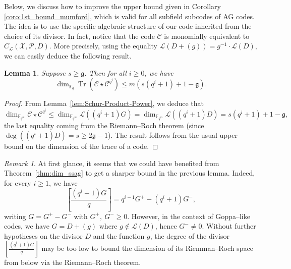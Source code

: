 \documentclass[a4paper]{amsart}
\newtheorem{lemma}[thm]{Lemma}
\theoremstyle{definition}
\theoremstyle{remark}
\newtheorem{remark}[thm]{Remark}
\newcommand{\calP}{\mathcal{P}}
\newcommand{\calL}{\mathcal{L}}
\newcommand{\calC}{\mathcal{C}}
\newcommand{\calX}{\mathcal{X}}
\newcommand{\fqm}{\mathbb{F}_{q^m}}
\newcommand{\fq}{\mathbb{F}_{q}}
\newcommand{\Tr}[1]{\operatorname{Tr}\left(#1\right)}
\begin{document}
Below, we discuss how to improve the upper bound given in Corollary \ref{coro:1st_bound_mumford}, which is valid for all subfield subcodes of AG codes. The idea is to use the specific algebraic structure of our code inherited from the choice of its divisor.
\noindent In fact, notice that the code $\calC$ is monomially equivalent to $C_{\calL}(\calX,\calP,D)$. 
More precisely, using the equality $\calL(D+(g)) = g^{-1} \cdot \calL(D),$
we can easily deduce the following result.

\begin{lemma} \label{lem:bound_dim_Tr(C*C^q^i)}
  Suppose $s \geq \mathfrak{g}$. Then for all $i \geq 0$, we have 
   $$\dim_{\fq} \Tr{\calC\star \calC^{q^i}} \leq m\left(s\left(q^i+1\right)+1-\mathfrak{g}\right).$$
\end{lemma}
\begin{proof}
From Lemma~\ref{lem:Schur-Product-Power}, we deduce that 
\[\dim_{\fqm} \calC\star \calC^{q^i} \leq \dim_{\fqm} \calL((q^i+1)G) = \dim_{\fqm} \calL((q^i+1)D) = s(q^i+1)+1-\mathfrak{g},\]
the last equality coming from the Riemann--Roch theorem (since $\deg \left((q^i+1)D\right) =s \geq 2\mathfrak{g}-1$). The result follows from the usual upper bound on the dimension of the trace of a code. 
\end{proof}

\begin{remark}\label{rmk:improvements}
	At first glance, it seems that we could have benefited from Theorem~\ref{thm:dim_ssag} to get a sharper bound in the previous lemma. Indeed, for every $i \geq 1$, we have 
	\[\left[\frac{(q^i+1)G}{q}\right]=q^{i-1}G^+ - (q^i+1)G^-,\]
	writing $G=G^+-G^-$ with $G^+, \: G^- \geq 0$. However, in the context of Goppa--like codes, we have $G=D+(g)$ where $g \notin \calL(D)$, hence $G^- \neq 0$. Without further hypotheses on the divisor $D$ and the function $g$, the degree of the divisor $\left[\frac{(q^i+1)G}{q}\right]$ may be too low to bound the dimension of its Riemman--Roch space from below via the Riemann--Roch theorem.
\end{remark}
\end{document}
